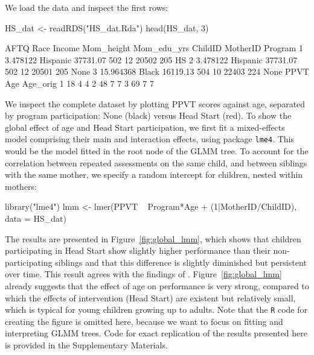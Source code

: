 \documentclass[doc,floatsintext,natbib]{apa7}
\begin{document}
We load the data and inspect the first rows:

\begin{Schunk}
\begin{Sinput}
 HS_dat <- readRDS("HS_dat.Rda")
 head(HS_dat, 3)
\end{Sinput}
\begin{Soutput}
       AFTQ     Race   Income Mom_height Mom_edu_yrs ChildID MotherID Program
1  3.478122 Hispanic 37731.07        502          12   20502      205      HS
2  3.478122 Hispanic 37731.07        502          12   20501      205    None
3 15.964368    Black 16119.13        504          10   22403      224    None
  PPVT Age Age_orig
1   18   4        4
2   48   7        7
3   69   7        7
\end{Soutput}
\end{Schunk}

We inspect the complete dataset by plotting PPVT scores against age, separated by program participation: None (black) versus Head Start (red). To show the global effect of age and Head Start participation, we first fit a mixed-effects model comprising their main and interaction effects, using package \texttt{lme4}. This would be the model fitted in the root node of the GLMM tree. To account for the correlation between repeated assessments on the same child, and between siblings with the same mother, we specify a random intercept for children, nested within mothers:

\begin{Schunk}
\begin{Sinput}
 library("lme4")
 lmm <- lmer(PPVT ~ Program*Age + (1|MotherID/ChildID), data = HS_dat)
\end{Sinput}
\end{Schunk}

The results are presented in Figure~\ref{fig:global_lmm}, which shows that children participating in Head Start show slightly higher performance than their non-participating siblings and that this difference is slightly diminished but persistent over time. This result agrees with the findings of \cite{Demi09}. Figure~\ref{fig:global_lmm} already suggests that the effect of age on performance is very strong, compared to which the effects of intervention (Head Start) are existent but relatively small, which is typical for young children growing up to adults. Note that the \texttt{R} code for creating the figure is omitted here, because we want to focus on fitting and interpreting GLMM trees. Code for exact replication of the results presented here is provided in the Supplementary Materials. 
\end{document}
